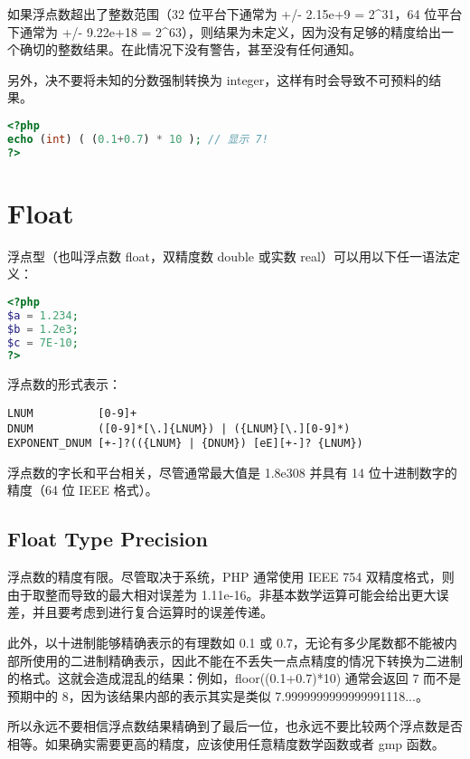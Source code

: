 如果浮点数超出了整数范围（32 位平台下通常为 +/- 2.15e+9 = 2\^{}31，64 位平台下通常为 +/- 9.22e+18 = 2\^{}63），则结果为未定义，因为没有足够的精度给出一个确切的整数结果。在此情况下没有警告，甚至没有任何通知。

另外，决不要将未知的分数强制转换为 integer，这样有时会导致不可预料的结果。

\begin{lstlisting}[language=PHP]
<?php
echo (int) ( (0.1+0.7) * 10 ); // 显示 7!
?>
\end{lstlisting}

\section{Float}

浮点型（也叫浮点数 float，双精度数 double 或实数 real）可以用以下任一语法定义：

\begin{lstlisting}[language=PHP]
<?php
$a = 1.234; 
$b = 1.2e3; 
$c = 7E-10;
?>
\end{lstlisting}

浮点数的形式表示：

\begin{verbatim}
LNUM          [0-9]+
DNUM          ([0-9]*[\.]{LNUM}) | ({LNUM}[\.][0-9]*)
EXPONENT_DNUM [+-]?(({LNUM} | {DNUM}) [eE][+-]? {LNUM})
\end{verbatim}


浮点数的字长和平台相关，尽管通常最大值是 1.8e308 并具有 14 位十进制数字的精度（64 位 IEEE 格式）。


\subsection{Float Type Precision}


浮点数的精度有限。尽管取决于系统，PHP 通常使用 IEEE 754 双精度格式，则由于取整而导致的最大相对误差为 1.11e-16。非基本数学运算可能会给出更大误差，并且要考虑到进行复合运算时的误差传递。

此外，以十进制能够精确表示的有理数如 0.1 或 0.7，无论有多少尾数都不能被内部所使用的二进制精确表示，因此不能在不丢失一点点精度的情况下转换为二进制的格式。这就会造成混乱的结果：例如，floor((0.1+0.7)*10) 通常会返回 7 而不是预期中的 8，因为该结果内部的表示其实是类似 7.9999999999999991118...。

所以永远不要相信浮点数结果精确到了最后一位，也永远不要比较两个浮点数是否相等。如果确实需要更高的精度，应该使用任意精度数学函数或者 gmp 函数。

